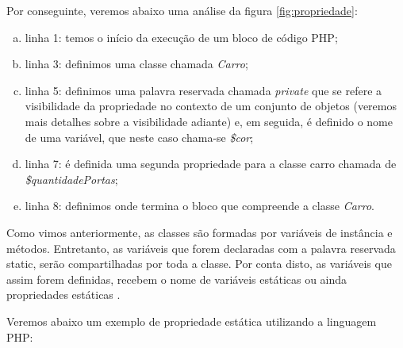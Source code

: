 Por conseguinte, veremos abaixo uma análise da figura \ref{fig:propriedade}:

\begin{enumerate}[a)]
    \item linha 1: temos o início da execução de um bloco de código PHP;
    \item linha 3: definimos uma classe chamada \textit{Carro};
    \item linha 5: definimos uma palavra reservada chamada
    \textit{private} que se refere a visibilidade da propriedade no contexto  de
    um conjunto de objetos (veremos mais detalhes sobre a visibilidade adiante)
    e, em seguida, é definido o nome de uma variável, que neste caso chama-se
    \textit{\$cor};
    \item linha 7: é definida uma segunda propriedade para a classe
    carro chamada de \textit{\$quantidadePortas};
    \item linha 8: definimos onde termina o bloco que compreende a
    classe \textit{Carro}.
\end{enumerate}


Como vimos anteriormente, as classes são formadas por variáveis de instância e
métodos. Entretanto, as variáveis que forem declaradas com a palavra reservada
static, serão compartilhadas por toda a classe. Por conta disto, as variáveis
que assim forem definidas, recebem o nome de variáveis estáticas ou ainda
propriedades estáticas \cite{learningJava}.

Veremos abaixo um exemplo de propriedade estática utilizando a linguagem PHP:
